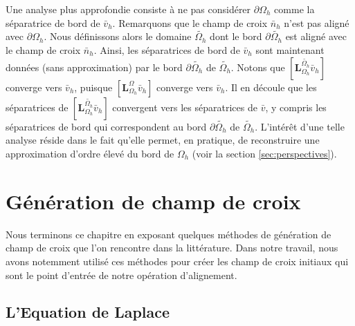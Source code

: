 Une analyse plus approfondie consiste à ne pas considérer $\partial\Omega_h$ comme la séparatrice de bord de $\bar{v}_h$. Remarquons que le champ de croix $\bar{n}_h$ n'est pas aligné avec $\partial\Omega_h$. Nous définissons alors le domaine $\widetilde{\Omega_h}$ dont le bord $\partial\widetilde{\Omega_h}$ est aligné avec le champ de croix $\bar{n}_h$. Ainsi, les séparatrices de bord de $\bar{v}_h$ sont maintenant données (sans approximation) par le bord $\partial\widetilde{\Omega_h}$ de $\widetilde{\Omega_h}$. Notons que $[\mathbf{L}_{\Omega_h}^{\widetilde{\Omega_h}}\bar{v}_h]$ converge vers $\bar{v}_h$, puisque $[\mathbf{L}_{\Omega_h}^{\Omega}\bar{v}_h]$ converge vers $\bar{v}_h$. Il en découle que les séparatrices de $[\mathbf{L}_{\Omega_h}^{\widetilde{\Omega_h}}\bar{v}_h]$ convergent vers les séparatrices de $\bar{v}$, y compris les séparatrices de bord qui correspondent au bord $\partial\widetilde{\Omega_h}$ de $\widetilde{\Omega_h}$. L'intérêt d'une telle analyse réside dans le fait qu'elle permet, en pratique, de reconstruire une approximation d'ordre élevé du bord de $\Omega_h$ (voir la section \ref{sec:perspectives}).

\section{Génération de champ de croix}
\label{subsec:gen_cross_field}

Nous terminons ce chapitre en exposant quelques méthodes de génération de champ de croix que l'on rencontre dans la littérature. Dans notre travail, nous avons notemment utilisé ces méthodes pour créer les champ de croix initiaux qui sont le point d'entrée de notre opération d'alignement.

\subsection{L'Equation de Laplace}
\label{subsec:laplace_equation_generation}

